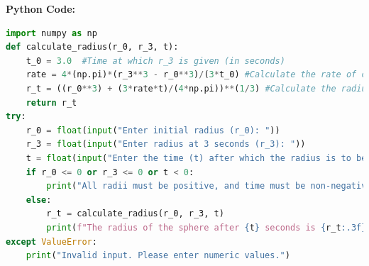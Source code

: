 \documentclass[journal]{IEEEtran}
\numberwithin{equation}{enumi}
\numberwithin{figure}{enumi}
\begin{document}
\textbf{Python Code:}
\begin{lstlisting}[language=Python]
import numpy as np
def calculate_radius(r_0, r_3, t):
    t_0 = 3.0  #Time at which r_3 is given (in seconds) 
    rate = 4*(np.pi)*(r_3**3 - r_0**3)/(3*t_0) #Calculate the rate of change of volume
    r_t = ((r_0**3) + (3*rate*t)/(4*np.pi))**(1/3) #Calculate the radius at time t
    return r_t
try:
    r_0 = float(input("Enter initial radius (r_0): "))
    r_3 = float(input("Enter radius at 3 seconds (r_3): "))
    t = float(input("Enter the time (t) after which the radius is to be found: "))
    if r_0 <= 0 or r_3 <= 0 or t < 0:
        print("All radii must be positive, and time must be non-negative.")
    else:
        r_t = calculate_radius(r_0, r_3, t)
        print(f"The radius of the sphere after {t} seconds is {r_t:.3f} units.")
except ValueError:
    print("Invalid input. Please enter numeric values.")
\end{lstlisting}
\end{document}
